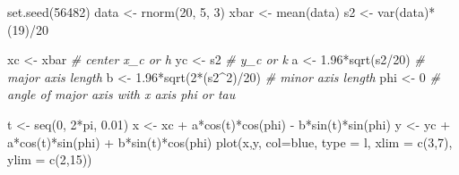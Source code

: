 \documentclass[
]{book}
\newenvironment{Shaded}{\begin{snugshade}}{\end{snugshade}}
\newcommand{\AttributeTok}[1]{\textcolor[rgb]{0.77,0.63,0.00}{#1}}
\newcommand{\CommentTok}[1]{\textcolor[rgb]{0.56,0.35,0.01}{\textit{#1}}}
\newcommand{\DecValTok}[1]{\textcolor[rgb]{0.00,0.00,0.81}{#1}}
\newcommand{\FloatTok}[1]{\textcolor[rgb]{0.00,0.00,0.81}{#1}}
\newcommand{\FunctionTok}[1]{\textcolor[rgb]{0.00,0.00,0.00}{#1}}
\newcommand{\NormalTok}[1]{#1}
\newcommand{\OtherTok}[1]{\textcolor[rgb]{0.56,0.35,0.01}{#1}}
\newcommand{\SpecialCharTok}[1]{\textcolor[rgb]{0.00,0.00,0.00}{#1}}
\newcommand{\StringTok}[1]{\textcolor[rgb]{0.31,0.60,0.02}{#1}}
\begin{document}
\begin{Shaded}
\begin{Highlighting}[]
\FunctionTok{set.seed}\NormalTok{(}\DecValTok{56482}\NormalTok{)}
\NormalTok{data }\OtherTok{\textless{}{-}} \FunctionTok{rnorm}\NormalTok{(}\DecValTok{20}\NormalTok{, }\DecValTok{5}\NormalTok{, }\DecValTok{3}\NormalTok{)}
\NormalTok{xbar }\OtherTok{\textless{}{-}} \FunctionTok{mean}\NormalTok{(data)}
\NormalTok{s2 }\OtherTok{\textless{}{-}} \FunctionTok{var}\NormalTok{(data)}\SpecialCharTok{*}\NormalTok{(}\DecValTok{19}\NormalTok{)}\SpecialCharTok{/}\DecValTok{20}

\NormalTok{xc }\OtherTok{\textless{}{-}}\NormalTok{ xbar }\CommentTok{\# center x\_c or h}
\NormalTok{yc }\OtherTok{\textless{}{-}}\NormalTok{ s2 }\CommentTok{\# y\_c or k}
\NormalTok{a }\OtherTok{\textless{}{-}} \FloatTok{1.96}\SpecialCharTok{*}\FunctionTok{sqrt}\NormalTok{(s2}\SpecialCharTok{/}\DecValTok{20}\NormalTok{) }\CommentTok{\# major axis length}
\NormalTok{b }\OtherTok{\textless{}{-}}  \FloatTok{1.96}\SpecialCharTok{*}\FunctionTok{sqrt}\NormalTok{(}\DecValTok{2}\SpecialCharTok{*}\NormalTok{(s2}\SpecialCharTok{\^{}}\DecValTok{2}\NormalTok{)}\SpecialCharTok{/}\DecValTok{20}\NormalTok{) }\CommentTok{\# minor axis length}
\NormalTok{phi }\OtherTok{\textless{}{-}} \DecValTok{0} \CommentTok{\# angle of major axis with x axis phi or tau}

\NormalTok{t }\OtherTok{\textless{}{-}} \FunctionTok{seq}\NormalTok{(}\DecValTok{0}\NormalTok{, }\DecValTok{2}\SpecialCharTok{*}\NormalTok{pi, }\FloatTok{0.01}\NormalTok{) }
\NormalTok{x }\OtherTok{\textless{}{-}}\NormalTok{ xc }\SpecialCharTok{+}\NormalTok{ a}\SpecialCharTok{*}\FunctionTok{cos}\NormalTok{(t)}\SpecialCharTok{*}\FunctionTok{cos}\NormalTok{(phi) }\SpecialCharTok{{-}}\NormalTok{ b}\SpecialCharTok{*}\FunctionTok{sin}\NormalTok{(t)}\SpecialCharTok{*}\FunctionTok{sin}\NormalTok{(phi)}
\NormalTok{y }\OtherTok{\textless{}{-}}\NormalTok{ yc }\SpecialCharTok{+}\NormalTok{ a}\SpecialCharTok{*}\FunctionTok{cos}\NormalTok{(t)}\SpecialCharTok{*}\FunctionTok{sin}\NormalTok{(phi) }\SpecialCharTok{+}\NormalTok{ b}\SpecialCharTok{*}\FunctionTok{sin}\NormalTok{(t)}\SpecialCharTok{*}\FunctionTok{cos}\NormalTok{(phi)}
\FunctionTok{plot}\NormalTok{(x,y, }\AttributeTok{col=}\StringTok{\textquotesingle{}blue\textquotesingle{}}\NormalTok{,  }\AttributeTok{type =} \StringTok{\textquotesingle{}l\textquotesingle{}}\NormalTok{, }\AttributeTok{xlim =} \FunctionTok{c}\NormalTok{(}\DecValTok{3}\NormalTok{,}\DecValTok{7}\NormalTok{), }\AttributeTok{ylim =} \FunctionTok{c}\NormalTok{(}\DecValTok{2}\NormalTok{,}\DecValTok{15}\NormalTok{))}


\end{Highlighting}
\end{Shaded}
\end{document}
